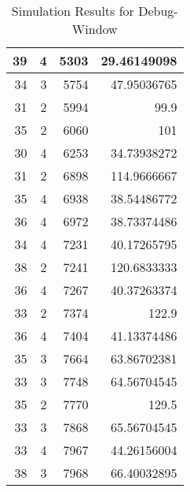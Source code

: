 \begin{table}[]
\begin{tabular}{|r|r|r|r|}
39 & 4 & 5303 & 29.46149098 \\ \hline
34 & 3 & 5754 & 47.95036765 \\ \hline
31 & 2 & 5994 & 99.9 \\ \hline
35 & 2 & 6060 & 101 \\ \hline
30 & 4 & 6253 & 34.73938272 \\ \hline
31 & 2 & 6898 & 114.9666667 \\ \hline
35 & 4 & 6938 & 38.54486772 \\ \hline
36 & 4 & 6972 & 38.73374486 \\ \hline
34 & 4 & 7231 & 40.17265795 \\ \hline
38 & 2 & 7241 & 120.6833333 \\ \hline
36 & 4 & 7267 & 40.37263374 \\ \hline
33 & 2 & 7374 & 122.9 \\ \hline
36 & 4 & 7404 & 41.13374486 \\ \hline
35 & 3 & 7664 & 63.86702381 \\ \hline
33 & 3 & 7748 & 64.56704545 \\ \hline
35 & 2 & 7770 & 129.5 \\ \hline
33 & 3 & 7868 & 65.56704545 \\ \hline
33 & 4 & 7967 & 44.26156004 \\ \hline
38 & 3 & 7968 & 66.40032895 \\ \hline
\end{tabular}
\caption{Simulation Results for Debug-Window}
\label{tab:simulation}
\end{table}